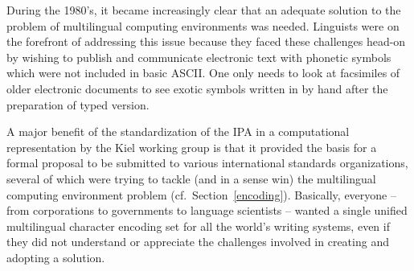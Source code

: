 During the 1980's, it became increasingly clear that an adequate solution 
to the problem of multilingual computing environments was needed. Linguists 
were on the forefront of addressing this issue because they faced these 
challenges head-on by wishing to publish and communicate electronic text 
with phonetic symbols which were not included in basic ASCII. One 
only needs to look at facsimiles of older electronic documents to see exotic 
symbols written in by hand after the preparation of typed version.




A major benefit of the standardization of the IPA in a computational
representation by the Kiel working group is that it provided the basis for a
formal proposal to be submitted to various international standards
organizations, several of which were trying to tackle (and in a sense win) the
multilingual computing environment problem (cf.\ Section~\ref{encoding}).
Basically, everyone -- from corporations to governments to language scientists
-- wanted a single unified multilingual character encoding set for all the
world's writing systems, even if they did not understand or appreciate the
challenges involved in creating and adopting a solution.


